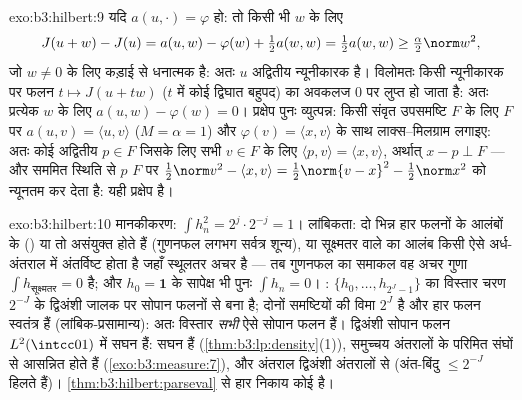 \begin{solution}{exo:b3:hilbert:9}
यदि $a(u, \cdot) = \varphi$ हो: तो किसी भी $w$ के लिए
\[
J(u + w) - J(u) = a(u, w) - \varphi(w) + \tfrac12a(w,w)
= \tfrac12a(w,w) \geq \tfrac\alpha2\norm w^2,
\]
जो $w \neq 0$ के लिए कड़ाई से धनात्मक है: अतः $u$ अद्वितीय न्यूनीकारक
है। विलोमतः किसी न्यूनीकारक पर फलन $t \mapsto J(u + tw)$ ($t$ में कोई द्विघात
बहुपद) का अवकलज $0$ पर लुप्त हो जाता है: अतः प्रत्येक $w$ के लिए
$a(u, w) - \varphi(w) = 0$। प्रक्षेप पुनः व्युत्पन्न: किसी संवृत उपसमष्टि $F$ के लिए
 $F$ पर $a(u,v) = \langle u, v\rangle$ ($M = \alpha = 1$) और $\varphi(v) = \langle x, v\rangle$ के साथ लाक्स--मिलग्राम
लगाइए: अतः कोई अद्वितीय $p \in F$ जिसके लिए सभी $v \in F$ के लिए $\langle p, v\rangle = \langle x,
v\rangle$,
अर्थात् $x - p \perp F$ --- और सममित स्थिति से $p$ $F$ पर $\frac12\norm v^2 - \langle
x, v\rangle = \frac12\norm{v - x}^2 - \frac12\norm x^2$ को न्यूनतम
कर देता है: यही प्रक्षेप है।
\end{solution}

\begin{solution}{exo:b3:hilbert:10}
मानकीकरण: $\int h_n^2 = 2^j\cdot 2^{-j} = 1$। लांबिकता: दो भिन्न हार फलनों के आलंबों के ()
या तो असंयुक्त होते हैं (गुणनफल लगभग सर्वत्र शून्य), या सूक्ष्मतर
वाले का आलंब किसी ऐसे अर्ध-अंतराल में अंतर्विष्ट होता है जहाँ स्थूलतर
अचर है --- तब गुणनफल का समाकल वह अचर गुणा $\int h_{\text{सूक्ष्मतर}} = 0$ है; और $h_0
= \mathbf 1$ के
सापेक्ष भी पुनः $\int h_n = 0$। : $\{h_0, \dots, h_{2^J-1}\}$ का विस्तार चरण $2^{-J}$ के द्विअंशी
जालक पर सोपान फलनों से बना है; दोनों समष्टियों की विमा $2^J$ है और
हार फलन स्वतंत्र हैं (लांबिक-प्रसामान्य): अतः विस्तार \emph{सभी} ऐसे
सोपान फलन हैं। द्विअंशी सोपान फलन $L^2(\intcc01)$ में सघन हैं:  सघन
हैं (\cref{thm:b3:lp:density}(1)),  समुच्चय अंतरालों के परिमित संघों से आसन्नित
होते हैं (\cref{exo:b3:measure:7}), और अंतराल द्विअंशी अंतरालों से (अंत-बिंदु $\leq 2^{-J}$
हिलते हैं)। \cref{thm:b3:hilbert:parseval} से हार निकाय कोई  है।
\end{solution}


